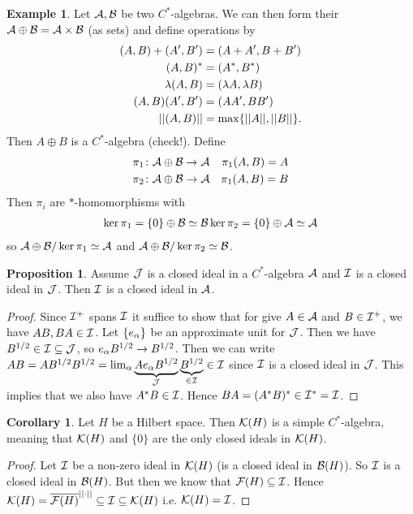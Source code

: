 \documentclass[10pt,english,a4paper]{article}
\theoremstyle{definition}
\newtheorem*{corollary}{Corollary}
\newtheorem*{proposition}{Proposition}
\newtheorem*{example}{Example}
\let\emph\relax %
\begin{document}
\begin{example}
Let $\mathcal{A}, \mathcal{B}$ be two $C^*$-algebras. We can then form their
\emph{direct sum} $\mathcal{A} \oplus \mathcal{B} = \mathcal{A} \times \mathcal{B}$ (as sets) and 
define operations by 
\begin{align*}
    (A,B)+(A',B') &= (A+A',B+B') \\
    (A,B)^* &= (A^*, B^*) \\
    \lambda (A,B) &= (\lambda A, \lambda B) \\
    (A,B)(A',B') &= (AA', BB') \\
    ||(A,B)|| &= \max\{||A||, ||B||\}.
\end{align*}    
Then $A\oplus B$ is a $C^*$-algebra (check!).
Define
\begin{align*}
    \pi_1 \colon \mathcal{A}\oplus \mathcal{B} \to \mathcal{A} && \pi_{1} (A,B) = A \\
    \pi_2 \colon \mathcal{A}\oplus \mathcal{B} \to \mathcal{A} && \pi_{1} (A,B) = B \\
\end{align*}
Then $\pi_i$ are $*$-homomorphisms with 
\begin{align*}
    \ker \pi_1 = \{0\} \oplus \mathcal{B} \simeq \mathcal{B}    
    \ker \pi_2 = \{0\} \oplus \mathcal{A} \simeq \mathcal{A}    
\end{align*}
so $\mathcal{A} \oplus\mathcal{B} /\ker \pi_1 \simeq \mathcal{A}$ and $\mathcal{A} \oplus\mathcal{B} /\ker \pi_2 \simeq
\mathcal{B}$.

\end{example}

\begin{proposition}
    Assume $\mathcal{J}$ is a closed ideal in a $C^*$-algebra $\mathcal{A}$ and 
$\mathcal{I}$ is a closed ideal in $\mathcal{J}$. Then $\mathcal{I}$ is a closed ideal in $\mathcal{A}$.
\end{proposition}
\begin{proof}
    Since $\mathcal{I}^+$ spans $\mathcal{I}$ it suffice to show that for give $A\in \mathcal{A}$ and 
$B \in \mathcal{I}^+$, we have $AB, BA \in \mathcal{I}$. Let 
$\{e_{\alpha}\}$ be an approximate unit for $\mathcal{J}$. Then we have 
$B^{1/2} \in \mathcal{I} \subseteq \mathcal{J}$, so $e_{\alpha}B^{1/2} \to B^{1/2}$.
Then we can write $AB = AB^{1/2}B^{1/2} = 
\lim_{\alpha} \underbrace{Ae_{\alpha}B^{1/2}}_{
\mathcal{J}} \underbrace{B^{1/2}}_{\in \mathcal{I}} \in \mathcal{I} $ since $\mathcal{I}$ is a closed ideal in $\mathcal{J}$.
This implies that we also have $A^*B \in \mathcal{I}$. Hence $BA = (A^*B)^* \in \mathcal{I}^* = \mathcal{I}$.


\end{proof}

\begin{corollary}
    Let $H$ be a Hilbert space. Then $\mathcal{K}(H)$ is a simple $C^*$-algebra, meaning 
that $\mathcal{K}(H)$ and $\{0\}$ are the only closed ideals in $\mathcal{K}(H)$.
\end{corollary}
\begin{proof}
    Let $\mathcal{I}$ be a non-zero ideal in $\mathcal{K}(H)$ (is a closed ideal in $\mathcal{B}(H)$). 
    So $\mathcal{I}$ is a closed ideal in $\mathcal{B}(H)$. But then we know that 
    $\mathcal{F}(H) \subseteq \mathcal{I}$. Hence $\mathcal{K}(H)  = \overline{\mathcal{F}(H)}^{||\cdot||} \subseteq
    \mathcal{I} \subseteq \mathcal{K}(H)$ i.e. $\mathcal{K}(H) = \mathcal{I}$.
\end{proof}
\end{document}
